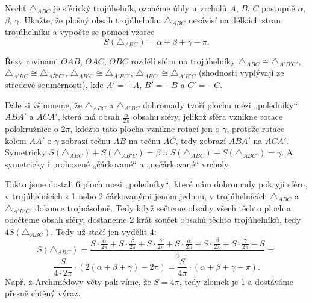 \documentclass[12pt]{article}                   %
\begin{document}
\begin{priklad}[4.1]
    Nechť $\triangle_{ABC}$ je sférický trojúhelník, označme úhly u vrcholů $A$, $B$, $C$ postupně $\alpha$, $\beta$, $\gamma$. Ukažte, že plošný obsah trojúhelníku $\triangle_{ABC}$ nezávisí na délkách stran trojúhelníku a vypočte se pomocí vzorce
    $$ S(\triangle_{ABC}) = \alpha + \beta + \gamma - \pi. $$ 

    \begin{dukazin}
        Řezy rovinami $OAB$, $OAC$, $OBC$ rozdělí sféru na trojúhelníky $\triangle_{ABC} \cong \triangle_{A'B'C'}$, $\triangle_{A'BC} \cong \triangle_{AB'C'}$, $\triangle_{AB'C} \cong \triangle_{A'BC'}$, $\triangle_{ABC'} \cong \triangle_{A'B'C}$ (shodnosti vyplývají ze středové souměrnosti), kde $A' = -A$, $B' = -B$ a $C' = -C$.

        Dále si všimneme, že $\triangle_{ABC}$ a $\triangle_{A'BC}$ dohromady tvoří plochu mezi „poledníky“ $ABA'$ a $ACA'$, která má obsah $\frac{\alpha}{2\pi}$ obsahu sféry, jelikož sféra vznikne rotace polokružnice o $2\pi$, kdežto tato plocha vznikne rotací jen o $\gamma$, protože rotace kolem $AA'$ o $\gamma$ zobrazí tečnu $AB$ na tečnu $AC$, tedy zobrazí $ABA'$ na $ACA'$. Symetricky $S(\triangle_{ABC}) + S(\triangle_{AB'C}) = \beta$ a $S(\triangle_{ABC}) + S(\triangle_{ABC'}) = \gamma$. A symetricky i prohozené „čárkované“ a „nečárkované“ vrcholy.

        Takto jsme dostali 6 ploch mezi „poledníky“, které nám dohromady pokryjí sféru, v trojúhelnících s 1 nebo 2 čárkovanými jenom jednou, v trojúhelnících $\triangle_{ABC}$ a $\triangle_{A'B'C'}$ dokonce trojnásobně. Tedy když sečteme obsahy všech těchto ploch a odečteme obsah sféry, dostaneme 2 krát součet obsahů těchto trojúhelníků, tedy $4S(\triangle_{ABC})$. Tedy už stačí jen vydělit 4:
        $$ S(\triangle_{ABC}) = \frac{S·\frac{\alpha}{2\pi} + S·\frac{\beta}{2\pi} + S·\frac{\gamma}{2\pi} + S·\frac{\alpha}{2\pi} + S·\frac{\beta}{2\pi} + S·\frac{\gamma}{2\pi} - S}{4} = $$
        $$ \frac{S}{4·2\pi}·(2(\alpha + \beta + \gamma) - 2\pi) = \frac{S}{4\pi}·(\alpha + \beta + \gamma - \pi). $$
        Např. z Archimédovy věty pak víme, že $S = 4\pi$, tedy zlomek je 1 a dostáváme přesně chtěný výraz.
    \end{dukazin}
\end{priklad}

\pagebreak
\end{document}
